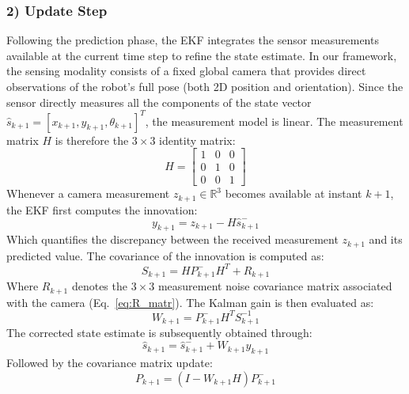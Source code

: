 \documentclass[times, twoside]{zHenriquesLab-StyleBioRxiv}
\begin{document}
\subsubsection*{2) Update Step}
Following the prediction phase, the EKF integrates the sensor measurements available at the current time step to refine the state estimate. In our framework, the sensing modality consists of a fixed global camera that provides direct observations of the robot's full pose (both 2D position and orientation). Since the sensor directly measures all the components of the state vector $\hat{s}_{k+1} = [x_{k+1}, y_{k+1}, \theta_{k+1}]^T$, the measurement model is linear. The measurement matrix $H$ is therefore the $3 \times 3$ identity matrix:
\begin{equation}
    H = \begin{bmatrix} 1 & 0 & 0 \\ 0 & 1 & 0 \\ 0 & 0 & 1 \end{bmatrix}
    \label{eq:ekf_H_matrix}
\end{equation}
Whenever a camera measurement $z_{k+1} \in \mathbb{R}^3$ becomes available at instant $k+1$, the EKF first computes the innovation:
\begin{equation}
    y_{k+1} = z_{k+1} - H \hat{s}_{k+1}^{-}
    \label{eq:ekf_innovation}
\end{equation}
Which quantifies the discrepancy between the received measurement $z_{k+1}$ and its predicted value. The covariance of the innovation is computed as:
\begin{equation}
    S_{k+1} = H P_{k+1}^{-} H^T + R_{k+1}
    \label{eq:ekf_innovation_cov}
\end{equation}
Where $R_{k+1}$ denotes the $3 \times 3$ measurement noise covariance matrix associated with the camera  (Eq.~\ref{eq:R_matr}). The Kalman gain is then evaluated as:
\begin{equation}
    W_{k+1} = P_{k+1}^{-} H^T S_{k+1}^{-1}
    \label{eq:ekf_kalman_gain}
\end{equation}
The corrected state estimate is subsequently obtained through:
\begin{equation}
    \hat{s}_{k+1} = \hat{s}_{k+1}^{-} + W_{k+1} y_{k+1}
    \label{eq:ekf_update_state}
\end{equation}
Followed by the covariance matrix update:
\begin{equation}
    P_{k+1} = (I - W_{k+1} H) P_{k+1}^{-}
    \label{eq:ekf_update_cov}
\end{equation}
\end{document}

